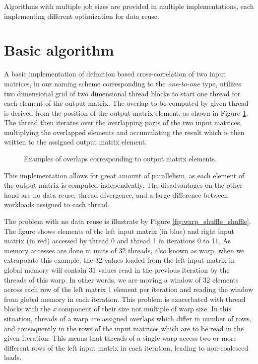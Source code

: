 Algorithms with multiple job sizes are provided in multiple implementations, each implementing different optimization for data reuse.


\section{Basic algorithm}
\label{sec:basic_alg}

A basic implementation of definition based cross-correlation of two input matrices, in our naming scheme corresponding to the \textit{one-to-one} type, utilizes two dimensional grid of two dimensional thread blocks to start one thread for each element of the output matrix. The overlap to be computed by given thread is derived from the position of the output matrix element, as shown in Figure \ref{fig:basic_algorithm_overlaps}. The thread then iterates over the overlapping parts of the two input matrices, multiplying the overlapped elements and accumulating the result which is then written to the assigned output matrix element.

\begin{figure}[ht]
	\fontsize{6}{8}\selectfont
	\centering
	\def\svgwidth{0.55\textwidth}
	
	\caption{Examples of overlaps corresponding to output matrix elements.}
	\label{fig:basic_algorithm_overlaps}
\end{figure}

This implementation allows for great amount of parallelism, as each element of the output matrix is computed independently.
The disadvantages on the other hand are no data reuse, thread divergence, and a large difference between workloads assigned to each thread.


The problem with no data reuse is illustrate by Figure \ref{fig:warp_shuffle_shuffle}. The figure shows elements of the left input matrix (in blue) and right input matrix (in red) accessed by thread 0 and thread 1 in iterations 0 to 11. As memory accesses are done in units of 32 threads, also known as warp, when we extrapolate this example, the 32 values loaded from the left input matrix in global memory will contain 31 values read in the previous iteration by the threads of this warp. In other words, we are moving a window of 32 elements across each row of the left matrix 1 element per iteration and reading the window from global memory in each iteration. This problem is exacerbated with thread blocks with the \textit{x} component of their size not multiple of warp size. In this situation, threads of a warp are assigned overlaps which differ in number of rows, and consequently in the rows of the input matrices which are to be read in the given iteration. This means that threads of a single warp access two or more different rows of the left input matrix in each iteration, leading to non-coalesced loads.

